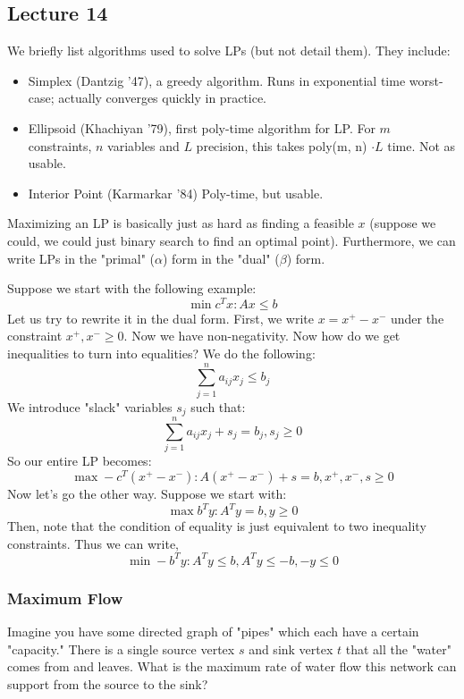 \subsection{Lecture 14}

We briefly list algorithms used to solve LPs (but not detail them). They include:
\begin{itemize}
    \item Simplex (Dantzig '47), a greedy algorithm. Runs in exponential time worst-case; actually converges quickly in practice.
    \item Ellipsoid (Khachiyan '79), first poly-time algorithm for LP. For $m$ constraints, $n$ variables and $L$ precision, this takes poly(m, n) $\cdot L$ time. Not as usable.
    \item Interior Point (Karmarkar '84) Poly-time, but usable.
\end{itemize}

Maximizing an LP is basically just as hard as finding a feasible $x$ (suppose we could, we could just binary search
to find an optimal point). Furthermore, we can write LPs in the "primal" ($\alpha$) form in the "dual" ($\beta$) form.

\begin{example}
    Suppose we start with the following example:
    \[\min c^T x : Ax \leq b\]
    Let us try to rewrite it in the dual form. First, we write $x = x^+ - x^-$ under the constraint $x^+, x^- \geq 0$.
    Now we have non-negativity. Now how do we get inequalities to turn into equalities? We do the following:
    \[ \sum_{j = 1}^n a_{ij} x_j \leq b_j \]
    We introduce "slack" variables $s_j$ such that:
    \[ \sum_{j = 1}^n a_{ij} x_j + s_j = b_j, s_j \geq 0 \]
    So our entire LP becomes:
    \[ \max -c^T (x^+ - x^-): A(x^+ - x^-) + s = b, x^+, x^-, s \geq 0 \]
    Now let's go the other way. Suppose we start with:
    \[ \max b^T y : A^T y = b, y \geq 0 \]
    Then, note that the condition of equality is just equivalent to two inequality constraints.
    Thus we can write,
    \[ \min -b^Ty : A^Ty \leq b, A^Ty \leq -b, -y \leq 0 \]
\end{example}

\subsubsection{Maximum Flow}
Imagine you have some directed graph of "pipes" which each have a certain "capacity."
There is a single source vertex $s$ and sink vertex $t$ that all the "water" comes from and leaves.
What is the maximum rate of water flow
this network can support from the source to the sink?

